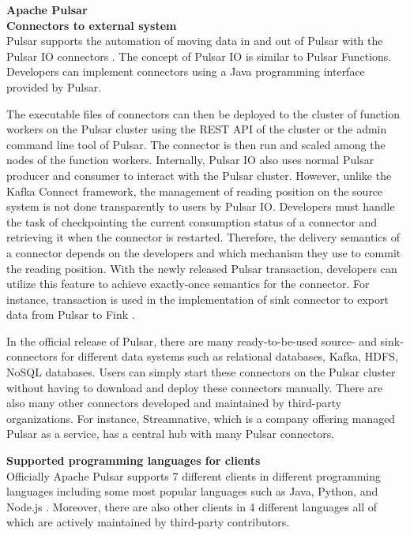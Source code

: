 \large \textbf{Apache Pulsar}\\
\normalsize
\textbf{Connectors to external system}\\
Pulsar supports the automation of moving data in and out of Pulsar with the Pulsar IO connectors \cite{pulsario}. The concept of Pulsar IO is similar to Pulsar Functions. Developers can implement connectors using a Java programming interface provided by Pulsar. 

The executable files of connectors can then be deployed to the cluster of function workers on the Pulsar cluster using the REST API of the cluster or the admin command line tool of Pulsar. The connector is then run and scaled among the nodes of the function workers. 
Internally, Pulsar IO also uses normal Pulsar producer and consumer to interact with the Pulsar cluster. However, unlike the Kafka Connect framework, the management of reading position on the source system is not done transparently to users by Pulsar IO. Developers must handle the task of checkpointing the current consumption status of a connector and retrieving it when the connector is restarted. Therefore, the delivery semantics of a connector depends on the developers and which mechanism they use to commit the reading position. With the newly released Pulsar transaction, developers can utilize this feature to achieve exactly-once semantics for the connector. For instance, transaction is used in the implementation of sink connector to export data from Pulsar to Fink \cite{pulsarflinkconnector}.

In the official release of Pulsar, there are many ready-to-be-used source- and sink-connectors for different data systems such as relational databases, Kafka, HDFS, NoSQL databases. Users can simply start these connectors on the Pulsar cluster without having to download and deploy these connectors manually. There are also many other connectors developed and maintained by third-party organizations. For instance, Streamnative, which is a company offering managed Pulsar as a service, has a central hub with many Pulsar connectors.  

\textbf{Supported programming languages for clients}\\
Officially Apache Pulsar supports 7 different clients in different programming languages including some most popular languages such as Java, Python, and Node.js \cite{pulsarclients}.  Moreover, there are also other clients in 4 different languages all of which are actively maintained by third-party contributors. 

